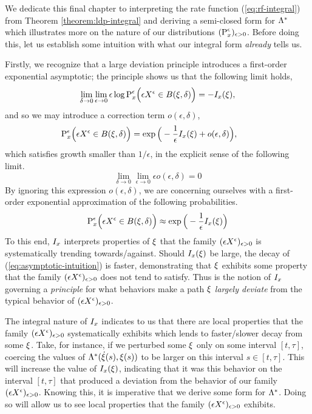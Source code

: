 We dedicate this final chapter to interpreting the rate function (\ref{eq:rf-integral}) from Theorem \ref{theorem:ldp-integral} and deriving a semi-closed form for $\Lambda^*$ which illustrates more on the nature of our distributions $({\operatorname{P}}^\epsilon_x)_{\epsilon>0}$.
Before doing this, let us establish some intuition with what our integral form \emph{already} tells us.

Firstly, we recognize that a large deviation principle introduces a first-order exponential asymptotic;
the principle shows us that the following limit holds,
\begin{equation*}
  \lim_{\delta\rightarrow0} \lim_{\epsilon\rightarrow0} \epsilon\log{\operatorname{P}}^\epsilon_{x}\Big( \epsilon X^\epsilon \in {B(\xi,\delta)} \Big) = -I_{x}(\xi),
\end{equation*}
and so we may introduce a correction term $o(\epsilon, \delta)$,
\begin{equation*}
  {\operatorname{P}}^\epsilon_{x}\Big( \epsilon X^\epsilon \in {B(\xi,\delta)} \Big)
  = \exp\Big( -\frac1\epsilon I_{x}(\xi) + o(\epsilon, \delta) \Big), 
  \qquad
\end{equation*}
which satisfies growth smaller than $1/\epsilon$, in the explicit sense of the following limit.
\begin{equation*}
  \lim_{\delta\rightarrow0} \lim_{\epsilon\rightarrow0} \epsilon o(\epsilon,\delta) = 0
\end{equation*}
By ignoring this expression $o(\epsilon, \delta)$, we are concerning ourselves with a first-order exponential approximation of the following probabilities.
\begin{equation}
  \label{eq:asymptotic-intuition}
  {\operatorname{P}}^\epsilon_{x}\Big( \epsilon X^\epsilon \in {B(\xi,\delta)} \Big) \approx 
  \exp\Big( -\frac1\epsilon I_{x}(\xi) \Big)
\end{equation}
To this end, $I_x$ interprets properties of $\xi$ that the family $(\epsilon X^\epsilon)_{\epsilon>0}$ is systematically trending towards/against.
Should $I_x(\xi)$ be large, the decay of (\ref{eq:asymptotic-intuition}) is faster, demonstrating that $\xi$ exhibits some property that the family $(\epsilon X^\epsilon)_{\epsilon>0}$ does not tend to satisfy.
Thus is the notion of $I_x$ governing a \emph{principle} for what behaviors make a path $\xi$ \emph{largely deviate} from the typical behavior of $(\epsilon X^\epsilon)_{\epsilon>0}$.

The integral nature of $I_x$ indicates to us that there are local properties that the family $(\epsilon X^\epsilon)_{\epsilon>0}$ systematically exhibits which lends to faster/slower decay from some $\xi$.
Take, for instance, if we perturbed some $\xi$ only on some interval $[t,\tau]$, coercing the values of $\Lambda^*(\dot{\xi}(s), \xi(s))$ to be larger on this interval $s \in [t,\tau]$.
This will increase the value of $I_x(\xi)$, indicating that it was this behavior on the interval $[t,\tau]$ that produced a deviation from the behavior of our family $(\epsilon X^\epsilon)_{\epsilon>0}$.
Knowing this, it is imperative that we derive some form for $\Lambda^*$.
Doing so will allow us to see local properties that the family $(\epsilon X^\epsilon)_{\epsilon>0}$ exhibits.

